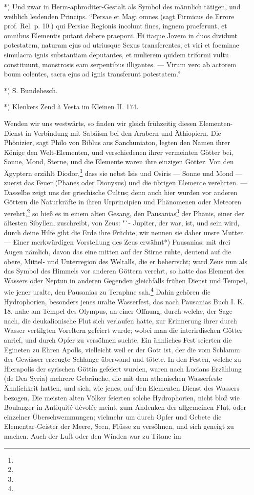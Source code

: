 \documentclass[a4paper, 11pt, oneside, polutonikogreek, german]{article}
\begin{document}
*) Und zwar in Herm-aphroditer-Gestalt als Symbol des männlich tätigen, und weiblich leidenden Princips. "`Persae et Magi omnes (sagt Firmicus de Errore prof. Rel. p. 10.) qui Persiae Regionis incolunt fines, ingnem praeferunt, et omnibus Elementis putant debere praeponi. Hi itaque Jovem in duos dividunt potestatem, naturam ejus ad utriusque Sexus transferentes, et viri et foeminae simulacra ignis substantiam deputantes, et mulierem quidem triformi vultu constituunt, monstrosis eam serpentibus illigantes. --- Virum vero ab actorem boum colentes, sacra ejus ad ignis transferunt potestatem."'

*) S. Bundehesch.

*) Kleukers Zend à Vesta im Kleinen II. 174.

Wenden wir uns westwärts, so finden wir gleich frühzeitig diesen Elementen-Dienst in Verbindung mit Sabäism bei den Arabern und Äthiopiern. Die Phönizier, sagt Philo von Biblus aus Sanchuniaton, legten den Namen ihrer Könige den Welt-Elementen, und verschiedenen ihrer vermeinten Götter bei, Sonne, Mond, Sterne, und die Elemente waren ihre einzigen Götter. Von den Ägyptern erzählt Diodor,\footnote{} dass sie nebst Isis und Osiris --- Sonne und Mond --- zuerst das Feuer (Phanes oder Dionysus) und die übrigen Elemente verehrten. --- Dasselbe zeigt uns der griechische Cultus; denn auch hier wurden vor anderen Göttern die Naturkräfte in ihren Urprincipien und Phänomenen oder Meteoren verehrt,\footnote{} so hieß es in einem alten Gesang, den Pausanias\footnote{} der Phänis, einer der ältesten Sibyllen, zuschreibt, von Zeus: "`- Jupiter, der war, ist, und sein wird, durch deine Hilfe gibt die Erde ihre Früchte, wir nennen sie daher unsre Mutter. --- Einer merkwürdigen Vorstellung des Zeus erwähnt*) Pausanias; mit drei Augen nämlich, davon das eine mitten auf der Stirne ruhte, deutend auf die obere, Mittel- und Unterregion des Weltalls, die er beherrscht; ward Zeus nun als das Symbol des Himmels vor anderen Göttern verehrt, so hatte das Element des Wassers oder Neptun in anderen Gegenden gleichfalls frühen Dienst und Tempel, wie jener uralte, den Pausanias zu Teraphne sah.\footnote{} Dahin gehören die Hydrophorien, besonders jenes uralte Wasserfest, das nach Pausanias Buch I. K. 18. nahe am Tempel des Olympus, an einer Öffnung, durch welche, der Sage nach, die deukalionische Flut sich verlaufen hatte, zur Erinnerung ihrer durch Wasser vertilgten Voreltern gefeiert wurde; wobei man die interirdischen Götter anrief, und durch Opfer zu versöhnen suchte. Ein ähnliches Fest seierten die Egineten zu Ehren Apolls, vielleicht weil er der Gott ist, der die vom Schlamm der Gewässer erzeugte Schlange überwand und tötete. In den Festen, welche zu Hierapolis der syrischen Göttin gefeiert wurden, waren nach Lucians Erzählung (de Dea Syria) mehrere Gebräuche, die mit dem athenischen Wasserfeste Ähnlichkeit hatten, und sich, wie jenes, auf den Elementen Dienst des Wassers bezogen. Die meisten alten Völker feierten solche Hydrophorien, nicht bloß wie Boulanger in Antiquité dévolée meint, zum Andenken der allgemeinen Flut, oder einzelner Überschwemmungen; vielmehr um durch Opfer und Gebete die Elementar-Geister der Meere, Seen, Flüsse zu versöhnen, und sich geneigt zu machen. Auch der Luft oder den Winden war zu Titane im 
\end{document}
